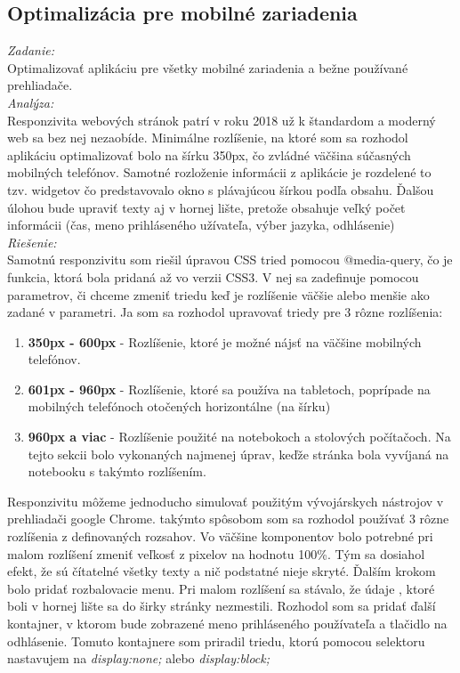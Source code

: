 \documentclass[11pt, oneside]{report}
\begin{document}
\subsection{Optimalizácia pre mobilné zariadenia}
\textit{Zadanie:}\\
Optimalizovať aplikáciu pre všetky mobilné zariadenia a bežne používané prehliadače.
\\\textit{Analýza:}\\
Responzivita webových stránok patrí v roku 2018 už k štandardom a moderný web sa bez nej nezaobíde. Minimálne rozlíšenie, na ktoré som sa rozhodol aplikáciu optimalizovať  bolo na šírku  350px, čo zvládné väčšina súčasných mobilných telefónov.  Samotné rozloženie  informácii z aplikácie je rozdelené to tzv. widgetov čo predstavovalo okno s plávajúcou šírkou podľa obsahu. Ďalšou úlohou bude upraviť  texty aj v hornej lište, pretože obsahuje veľký počet informácii (čas, meno prihláseného užívateľa, výber jazyka, odhlásenie)
\\\textit{Riešenie:}\\
Samotnú responzivitu som riešil  úpravou CSS tried pomocou \textsf{@media-query}, čo je funkcia, ktorá bola pridaná až vo verzii CSS3. V nej sa zadefinuje pomocou parametrov, či chceme zmeniť triedu keď je rozlíšenie väčšie alebo menšie ako zadané v parametri. Ja som sa rozhodol upravovať triedy pre 3 rôzne rozlíšenia:
\begin{enumerate}
\item \textbf{350px - 600px} - Rozlíšenie, ktoré je možné nájsť na väčšine mobilných telefónov.
\item \textbf{601px - 960px} -  Rozlíšenie, ktoré sa používa na tabletoch, poprípade na mobilných telefónoch otočených horizontálne (na šírku)
\item \textbf{960px a viac} -  Rozlíšenie použité na notebokoch a stolových počítačoch. Na tejto sekcii bolo vykonaných najmenej úprav, keďže stránka bola vyvíjaná na notebooku s takýmto rozlíšením.
\end{enumerate}
Responzivitu môžeme jednoducho simulovať použitým vývojárskych nástrojov  v prehliadači google Chrome. takýmto spôsobom som sa rozhodol používať 3 rôzne rozlíšenia z  definovaných rozsahov. Vo väčšine komponentov bolo potrebné pri malom rozlíšení zmeniť veľkosť z pixelov na hodnotu 100\%. Tým sa dosiahol efekt, že  sú čítatelné všetky texty a nič podstatné nieje skryté. Ďalším krokom bolo  pridať rozbalovacie menu. Pri malom rozlíšení sa stávalo, že údaje , ktoré boli v hornej lište  sa  do širky stránky nezmestili. Rozhodol som sa pridať ďalší kontajner, v ktorom bude zobrazené meno prihláseného používateľa a tlačidlo na odhlásenie. Tomuto  kontajnere som priradil triedu, ktorú  pomocou selektoru nastavujem na \textit{display:none;} alebo \textit{display:block;}
\end{document}
